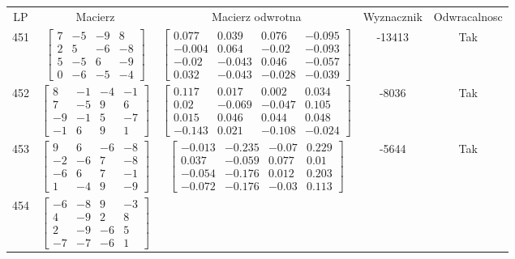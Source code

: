 \documentclass[a4paper,12pt]{article}
\begin{document}
\bgroup {} \vspace{0.2in} \begin{tabular}{c c c c c}
LP & Macierz & Macierz odwrotna & Wyznacznik & Odwracalnosc\\
451
&
$\begin{bmatrix} 7 & -5 & -9 & 8 \\ 2 & 5 & -6 & -8 \\ 5 & -5 & 6 & -9 \\ 0 & -6 & -5 & -4 \end{bmatrix}$
&
$\begin{bmatrix} 0.077 & 0.039 & 0.076 & -0.095 \\ -0.004 & 0.064 & -0.02 & -0.093 \\ -0.02 & -0.043 & 0.046 & -0.057 \\ 0.032 & -0.043 & -0.028 & -0.039 \end{bmatrix}$
&
-13413
&
Tak
\\
452
&
$\begin{bmatrix} 8 & -1 & -4 & -1 \\ 7 & -5 & 9 & 6 \\ -9 & -1 & 5 & -7 \\ -1 & 6 & 9 & 1 \end{bmatrix}$
&
$\begin{bmatrix} 0.117 & 0.017 & 0.002 & 0.034 \\ 0.02 & -0.069 & -0.047 & 0.105 \\ 0.015 & 0.046 & 0.044 & 0.048 \\ -0.143 & 0.021 & -0.108 & -0.024 \end{bmatrix}$
&
-8036
&
Tak
\\
453
&
$\begin{bmatrix} 9 & 6 & -6 & -8 \\ -2 & -6 & 7 & -8 \\ -6 & 6 & 7 & -1 \\ 1 & -4 & 9 & -9 \end{bmatrix}$
&
$\begin{bmatrix} -0.013 & -0.235 & -0.07 & 0.229 \\ 0.037 & -0.059 & 0.077 & 0.01 \\ -0.054 & -0.176 & 0.012 & 0.203 \\ -0.072 & -0.176 & -0.03 & 0.113 \end{bmatrix}$
&
-5644
&
Tak
\\
454
&
$\begin{bmatrix} -6 & -8 & 9 & -3 \\ 4 & -9 & 2 & 8 \\ 2 & -9 & -6 & 5 \\ -7 & -7 & -6 & 1 \end{bmatrix}$

\end{tabular}
\end{document}
